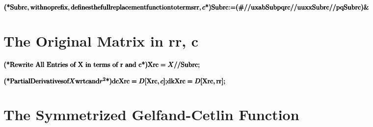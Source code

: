 \documentclass{article}
\begin{document}
\begin{doublespace}
\noindent\(\pmb{\text{(*} \text{Subrc}, \text{with} \text{no} \text{prefix}, \text{defines} \text{the} \text{full} \text{replacement} \text{function}
\text{to} \text{terms} \text{rr},c \text{*)}}\\
\pmb{\text{Subrc}\text{:=}(\#\text{//}\text{uxabSubpqrc}\text{//}\text{uuxxSubrc}\text{//}\text{pqSubrc})\&}\)
\end{doublespace}

\section*{The Original Matrix in rr, c}

\begin{doublespace}
\noindent\(\pmb{\text{(*Rewrite All Entries of X in terms of r and c*)}}\\
\pmb{\text{Xrc}=X\text{//}\text{Subrc};}\)
\end{doublespace}

\begin{doublespace}
\noindent\(\pmb{\text{(*}\text{Partial} \text{Derivatives} \text{of} X \text{wrt} c \text{and} r^2\text{*)}}\\
\pmb{\text{dcXrc} = D[\text{Xrc},c];}\\
\pmb{\text{dkXrc} = D[\text{Xrc},\text{rr}];}\)
\end{doublespace}

\section*{The Symmetrized Gelfand-Cetlin Function}
\end{document}
